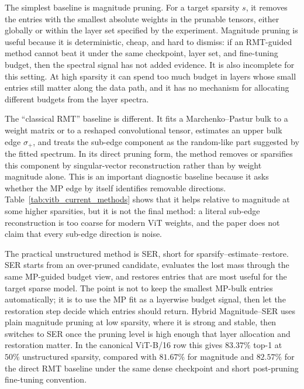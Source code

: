 \documentclass[11pt]{article}
\theoremstyle{plain}
\theoremstyle{definition}
\theoremstyle{remark}
\newcommand{\1}{\mathbf{1}}
\begin{document}
The simplest baseline is magnitude pruning.  For a target sparsity \(s\), it removes the entries with the smallest absolute weights in the prunable tensors, either globally or within the layer set specified by the experiment.  Magnitude pruning is useful because it is deterministic, cheap, and hard to dismiss: if an RMT-guided method cannot beat it under the same checkpoint, layer set, and fine-tuning budget, then the spectral signal has not added evidence.  It is also incomplete for this setting.  At high sparsity it can spend too much budget in layers whose small entries still matter along the data path, and it has no mechanism for allocating different budgets from the layer spectra.

The ``classical RMT'' baseline is different.  It fits a Marchenko--Pastur bulk to a weight matrix or to a reshaped convolutional tensor, estimates an upper bulk edge \(\sigma_+\), and treats the sub-edge component as the random-like part suggested by the fitted spectrum.  In its direct pruning form, the method removes or sparsifies this component by singular-vector reconstruction rather than by weight magnitude alone.  This is an important diagnostic baseline because it asks whether the MP edge by itself identifies removable directions.  Table~\ref{tab:vitb_current_methods} shows that it helps relative to magnitude at some higher sparsities, but it is not the final method: a literal sub-edge reconstruction is too coarse for modern ViT weights, and the paper does not claim that every sub-edge direction is noise.

The practical unstructured method is SER, short for sparsify--estimate--restore.  SER starts from an over-pruned candidate, evaluates the lost mass through the same MP-guided budget view, and restores entries that are most useful for the target sparse model.  The point is not to keep the smallest MP-bulk entries automatically; it is to use the MP fit as a layerwise budget signal, then let the restoration step decide which entries should return.  Hybrid Magnitude--SER uses plain magnitude pruning at low sparsity, where it is strong and stable, then switches to SER once the pruning level is high enough that layer allocation and restoration matter.  In the canonical ViT-B/16 row this gives \(83.37\%\) top-1 at \(50\%\) unstructured sparsity, compared with \(81.67\%\) for magnitude and \(82.57\%\) for the direct RMT baseline under the same dense checkpoint and short post-pruning fine-tuning convention.
\end{document}
